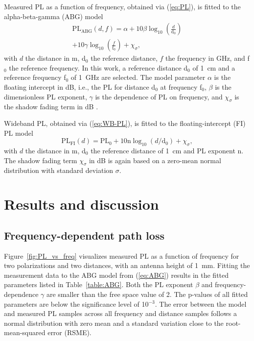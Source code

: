\documentclass[preprint]{rsl}
\begin{document}
Measured PL as a function of frequency, obtained via (\ref{eq:PL}), is fitted to the alpha-beta-gamma (ABG) model
\begin{multline}
  \text{PL}_{\text{ABG}}(d,f) = \alpha + 10 \beta \log_{10}\left(\frac{d}{\text{d}_0}\right) \\ + 10 \gamma \log_{10}\left(\frac{f}{ \text{f}_0}\right) + \chi_{\sigma},
  \label{eq:ABG}
\end{multline}
with $d$ the distance in m, d$_0$ the reference distance, $f$ the frequency in GHz, and f$_0$ the reference frequency.  
In this work, a reference distance d$_0$ of 1~cm and a reference frequency f$_0$ of 1~GHz are selected.
The model parameter $\alpha$ is the floating intercept in dB, i.e., the PL for distance d$_0$ at frequency f$_0$, $\beta$ is the dimensionless PL exponent, $\gamma$ is the dependence of PL on frequency, and $\chi_{\sigma}$ is the shadow fading term in dB \cite{Salous2020}. 

Wideband PL, obtained via (\ref{eq:WB-PL}), is fitted to the floating-intercept (FI) PL model 
\begin{equation}
  \text{PL}_{\text{FI}}(d) = \text{PL}_0 + 10 \text{n} \log_{10} (d/\text{d}_0) + \chi_\sigma, 
  \label{eq:FI}
\end{equation}
with $d$ the distance in m, d$_0$ the reference distance of 1~cm and PL exponent n. 
The shadow fading term $\chi_\sigma$ in dB is again based on a zero-mean normal distribution with standard deviation $\sigma$. 

\section{Results and discussion\label{sect:results}}

\subsection{Frequency-dependent path loss}

Figure~\ref{fig:PL_vs_freq} visualizes measured PL as a function of frequency for two polarizations and two distances, with an antenna height of 1~mm.
Fitting the measurement data to the ABG model from (\ref{eq:ABG}) results in the fitted parameters listed in Table~\ref{table:ABG}. 
Both the PL exponent $\beta$ and frequency-dependence $\gamma$ are smaller than the free space value of 2. 
The p-values of all fitted parameters are below the significance level of 10$^{-3}$. 
The error between the model and measured PL samples across all frequency and distance samples follows a normal distribution with zero mean and a standard variation close to the root-mean-squared error (RSME). 
\end{document}
